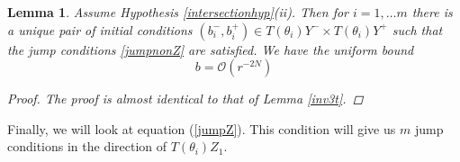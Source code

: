 \documentclass[12pt]{article}
\newtheorem{lemma}{Lemma}
\begin{document}
\begin{lemma}\label{inv3nt}
Assume Hypothesis \ref{intersectionhyp}(ii). Then for $i = 1, \dots m$ there is a unique pair of initial conditions $(b_i^-, b_i^+) \in T(\theta_i) Y^- \times T(\theta_i) Y^+$ such that the jump conditions \eqref{jumpnonZ} are satisfied. We have the uniform bound
\begin{equation}\label{bboundnt}
b = \mathcal{O}(r^{-2N})
\end{equation}
\begin{proof}
The proof is almost identical to that of Lemma \ref{inv3t}.
\end{proof}
\end{lemma}

Finally, we will look at equation (\ref{jumpZ}). This condition will give us $m$ jump conditions in the direction of $T(\theta_i) Z_1$.
\end{document}
